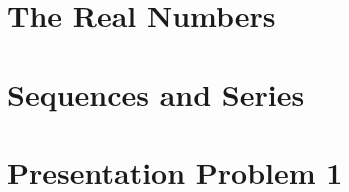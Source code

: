 \documentclass[12pt, oneside]{book}
\begin{document}

\chapter{The Real Numbers}\label{Real nums}
\vspace*{-0.25in}


\chapter{Sequences and Series}\label{sequences and series}
\vspace*{-0.25in}






% 

% 


% 

\chapter*{Presentation Problem 1}\label{pres 1}
\vspace*{0.25in}




\end{document}
